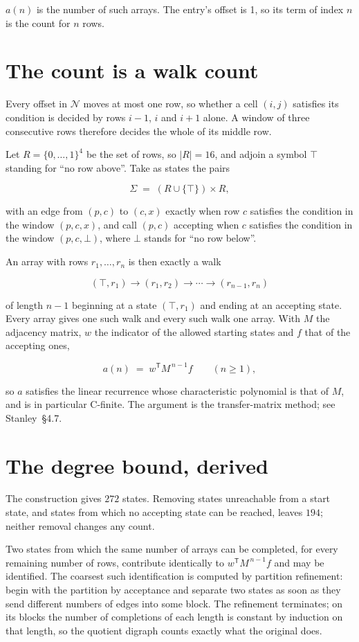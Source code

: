 \documentclass[11pt]{article}
\theoremstyle{definition}
\begin{document}
$a(n)$ is the number of such arrays. The entry's offset is 1, so its term of index $n$ is the count for $n$ rows.

\section{The count is a walk count}

Every offset in $\mathcal{N}$ moves at most one row, so whether a cell $(i,j)$ satisfies its condition is decided by rows $i-1$, $i$ and $i+1$ alone. A window of three consecutive rows therefore decides the whole of its middle row.

Let $R = \{0,\dots,1\}^{4}$ be the set of rows, so $|R| = 16$, and adjoin a symbol $\top$ standing for ``no row above''. Take as states the pairs

\[\Sigma \;=\; (R \cup \{\top\}) \times R,\]

with an edge from $(p,c)$ to $(c,x)$ exactly when row $c$ satisfies the condition in the window $(p,c,x)$, and call $(p,c)$ accepting when $c$ satisfies the condition in the window $(p,c,\bot)$, where $\bot$ stands for ``no row below''.

An array with rows $r_1,\dots,r_n$ is then exactly a walk

\[(\top,r_1) \to (r_1,r_2) \to \cdots \to (r_{n-1},r_n)\]

of length $n-1$ beginning at a state $(\top,r_1)$ and ending at an accepting state. Every array gives one such walk and every such walk one array. With $M$ the adjacency matrix, $w$ the indicator of the allowed starting states and $f$ that of the accepting ones,

\[a(n) \;=\; w^{\mathsf T} M^{\,n-1} f \qquad (n \ge 1),\]

so $a$ satisfies the linear recurrence whose characteristic polynomial is that of $M$, and is in particular C-finite. The argument is the transfer-matrix method; see Stanley~\S4.7.

\section{The degree bound, derived}

The construction gives $272$ states. Removing states unreachable from a start state, and states from which no accepting state can be reached, leaves $194$; neither removal changes any count.

Two states from which the same number of arrays can be completed, for every remaining number of rows, contribute identically to $w^{\mathsf T}M^{\,n-1}f$ and may be identified. The coarsest such identification is computed by partition refinement: begin with the partition by acceptance and separate two states as soon as they send different numbers of edges into some block. The refinement terminates; on its blocks the number of completions of each length is constant by induction on that length, so the quotient digraph counts exactly what the original does.
\end{document}

